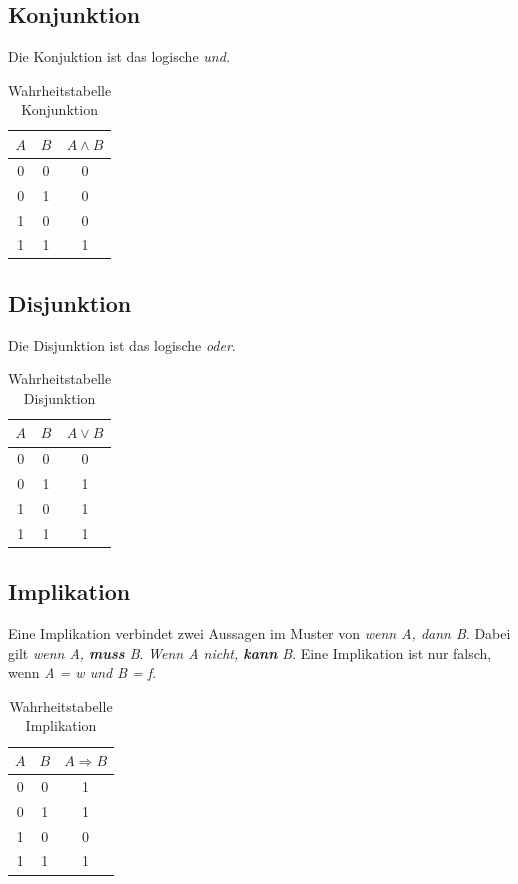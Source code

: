 \documentclass{article}
\begin{document}
\subsection{Konjunktion}
Die Konjuktion ist das logische \textit{und.}
\begin{table}[h!]
		\begin{center}
				\caption{Wahrheitstabelle Konjunktion}
				\label{tab:}
				\begin{tabular}{c c|c}
						\(A\)& \(B\) & \(A \wedge B\) \\
						\hline
						0 & 0 & 0\\
						0 & 1 & 0\\
						1 & 0 & 0\\
						1 & 1 & 1\\
				\end{tabular}
		\end{center}
\end{table}
\subsection{Disjunktion}
Die Disjunktion ist das logische \textit{oder}. 
\begin{table}[h!]
		\begin{center}
				\caption{Wahrheitstabelle Disjunktion}
				\label{tab:}
				\begin{tabular}{c c|c}
						\(A\)& \(B\) & \(A \vee B\) \\
						\hline
						0 & 0 & 0\\
						0 & 1 & 1\\
						1 & 0 & 1\\
						1 & 1 & 1\\
				\end{tabular}
		\end{center}
\end{table}
\subsection{Implikation}
Eine Implikation verbindet zwei Aussagen im Muster von \textit{wenn A, dann B}. Dabei gilt \textit{wenn A, \textbf{muss} B}. \textit{Wenn A nicht, \textbf{kann} B}. Eine Implikation ist nur falsch, wenn \textit{A = w und B = f}.
\begin{table}[h!]
		\begin{center}
				\caption{Wahrheitstabelle Implikation}
				\label{tab:}
				\begin{tabular}{c c|c}
						\(A\) & \(B\) & \(A \Rightarrow B\) \\
						\hline
						0 & 0 & 1\\
						0 & 1 & 1\\
						1 & 0 & 0\\
						1 & 1 & 1\\
				\end{tabular}
		\end{center}
\end{table}
\end{document}
